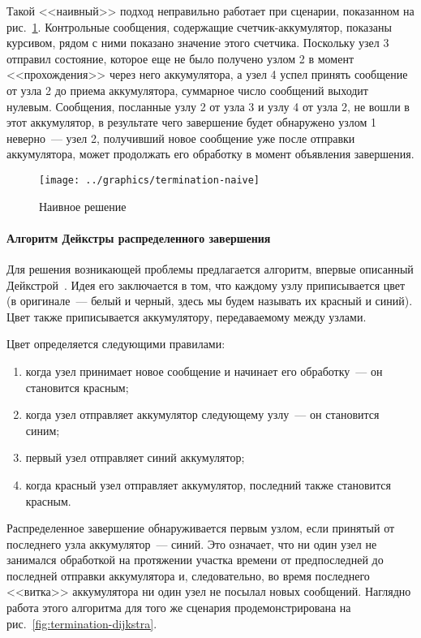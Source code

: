 Такой <<наивный>> подход неправильно работает при сценарии, показанном на
рис.~\ref{fig:termination-naive}. Контрольные сообщения, содержащие счетчик-аккумулятор,
показаны курсивом, рядом с ними показано значение этого счетчика. Поскольку узел 3
отправил состояние, которое еще не было получено узлом 2 в момент <<прохождения>> через
него аккумулятора, а узел 4 успел принять сообщение от узла 2 до приема аккумулятора,
суммарное число сообщений выходит нулевым. Сообщения, посланные узлу 2 от узла 3 и узлу 4
от узла 2, не вошли в этот аккумулятор, в результате чего завершение будет обнаружено
узлом 1 неверно~--- узел 2, получивший новое сообщение уже после отправки аккумулятора,
может продолжать его обработку в момент объявления завершения.

\begin{figure}[htb]
  \centering
  \texttt{[image: ../graphics/termination-naive]}  
  \caption{Наивное решение}
\label{fig:termination-naive}
\end{figure}

\paragraph{Алгоритм Дейкстры распределенного завершения}

Для решения возникающей проблемы предлагается алгоритм, впервые описанный
Дейкстрой~\cite{DistrTerm}. Идея его заключается в том, что каждому узлу приписывается
цвет (в оригинале~--- белый и черный, здесь мы будем называть их красный и синий). Цвет
также приписывается аккумулятору, передаваемому между узлами.

Цвет определяется следующими правилами:
\begin{enumerate}
\item когда узел принимает новое сообщение и начинает его обработку~--- он становится красным;
\item когда узел отправляет аккумулятор следующему узлу~--- он становится синим;
\item первый узел отправляет синий аккумулятор;
\item когда красный узел отправляет аккумулятор, последний также становится красным.
\end{enumerate}

Распределенное завершение обнаруживается первым узлом, если принятый от последнего узла
аккумулятор~--- синий. Это означает, что ни один узел не занимался обработкой на
протяжении участка времени от предпоследней до последней отправки аккумулятора и,
следовательно, во время последнего <<витка>> аккумулятора ни один узел не посылал новых
сообщений. Наглядно работа этого алгоритма для того же сценария продемонстрирована на
рис.~\ref{fig:termination-dijkstra}.

